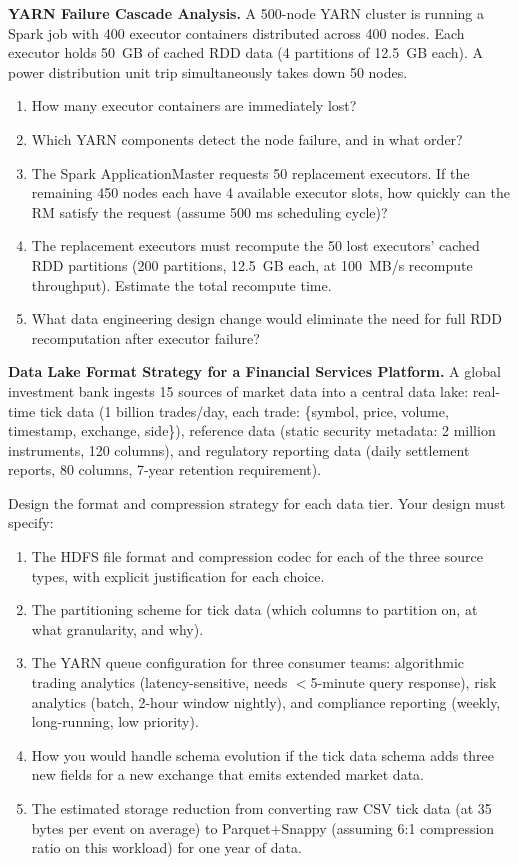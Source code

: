 \ap \textbf{YARN Failure Cascade Analysis.}
A 500-node YARN cluster is running a Spark job with 400 executor
containers distributed across 400 nodes. Each executor holds 50~GB of
cached RDD data (4 partitions of 12.5~GB each). A power distribution
unit trip simultaneously takes down 50 nodes.

\begin{enumerate}[label=(\alph*)]
  \item How many executor containers are immediately lost?
  \item Which YARN components detect the node failure, and in what order?
  \item The Spark ApplicationMaster requests 50 replacement executors.
        If the remaining 450 nodes each have 4 available executor slots,
        how quickly can the RM satisfy the request (assume 500 ms
        scheduling cycle)?
  \item The replacement executors must recompute the 50 lost executors'
        cached RDD partitions (200 partitions, 12.5~GB each, at
        100~MB/s recompute throughput). Estimate the total recompute time.
  \item What data engineering design change would eliminate the need
        for full RDD recomputation after executor failure?
\end{enumerate}

\bigskip
{}

\dpr \textbf{Data Lake Format Strategy for a Financial Services Platform.}
A global investment bank ingests 15 sources of market data into a central
data lake: real-time tick data (1 billion trades/day, each trade:
\{symbol, price, volume, timestamp, exchange, side\}), reference data
(static security metadata: 2 million instruments, 120 columns),
and regulatory reporting data (daily settlement reports, 80 columns,
7-year retention requirement).

Design the format and compression strategy for each data tier. Your
design must specify:
\begin{enumerate}[label=(\alph*)]
  \item The HDFS file format and compression codec for each of the
        three source types, with explicit justification for each choice.
  \item The partitioning scheme for tick data (which columns to partition
        on, at what granularity, and why).
  \item The YARN queue configuration for three consumer teams: algorithmic
        trading analytics (latency-sensitive, needs $<$5-minute query
        response), risk analytics (batch, 2-hour window nightly), and
        compliance reporting (weekly, long-running, low priority).
  \item How you would handle schema evolution if the tick data schema
        adds three new fields for a new exchange that emits extended
        market data.
  \item The estimated storage reduction from converting raw CSV tick
        data (at 35 bytes per event on average) to Parquet+Snappy
        (assuming 6:1 compression ratio on this workload) for one
        year of data.
\end{enumerate}

